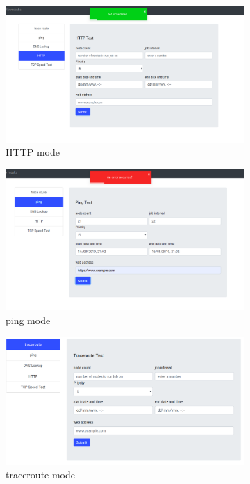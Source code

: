 \begin{figure}
	\begin{subfigure}{.5\textwidth}
		\centering
		\includegraphics[width=.8\linewidth]{images/fdhttp}
		\caption{HTTP mode}
		\label{fig:sfig1}
	\end{subfigure}
	\begin{subfigure}{.5\textwidth}
		\centering
		\includegraphics[width=.8\linewidth]{images/feedback2}
		\caption{ping mode}
		\label{fig:sfig2}
	\end{subfigure}
	\begin{subfigure}{.5\textwidth}
	\centering
	\includegraphics[width=.8\linewidth]{images/troute}
	\caption{traceroute mode}
	\label{fig:sfig3}
\end{subfigure}
	\begin{subfigure}{.5\textwidth}

\end{subfigure}
\end{figure}
